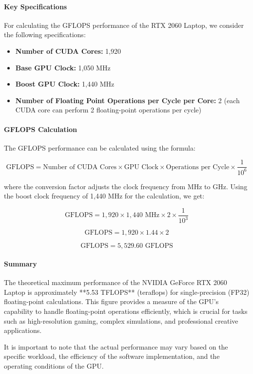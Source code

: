 \paragraph{Key Specifications}

For calculating the GFLOPS performance of the RTX 2060 Laptop, we consider the following specifications:

\begin{itemize}
    \item \textbf{Number of CUDA Cores:} 1,920
    \item \textbf{Base GPU Clock:} 1,050 MHz
    \item \textbf{Boost GPU Clock:} 1,440 MHz
    \item \textbf{Number of Floating Point Operations per Cycle per Core:} 2 (each CUDA core can perform 2 floating-point operations per cycle)
\end{itemize}

\paragraph{GFLOPS Calculation}

The GFLOPS performance can be calculated using the formula:

\[
\text{GFLOPS} = \text{Number of CUDA Cores} \times \text{GPU Clock} \times \text{Operations per Cycle} \times \frac{1}{10^6}
\]

where the conversion factor adjusts the clock frequency from MHz to GHz. Using the boost clock frequency of 1,440 MHz for the calculation, we get:

\[
\text{GFLOPS} = 1,920 \times 1,440 \text{ MHz} \times 2 \times \frac{1}{10^3}
\]

\[
\text{GFLOPS} = 1,920 \times 1.44 \times 2
\]

\[
\text{GFLOPS} = 5,529.60 \text{ GFLOPS}
\]

\paragraph{Summary}

The theoretical maximum performance of the NVIDIA GeForce RTX 2060 Laptop is approximately **5.53 TFLOPS** (teraflops) for single-precision (FP32) floating-point calculations. This figure provides a measure of the GPU's capability to handle floating-point operations efficiently, which is crucial for tasks such as high-resolution gaming, complex simulations, and professional creative applications.

It is important to note that the actual performance may vary based on the specific workload, the efficiency of the software implementation, and the operating conditions of the GPU.




\newpage
